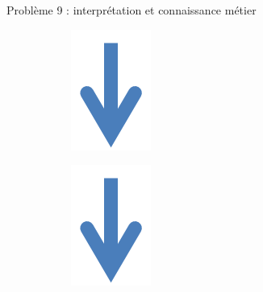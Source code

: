 \documentclass[10pt]{beamer}
\begin{document}
\begin{frame} {Problème 9 : interprétation et connaissance métier}
\begin{figure}[H]
\begin{subfigure}[l]{0.05\textwidth}
\centering
\includegraphics[width=\textwidth, height=\textwidth]{figures/fleche_bas.png}
\label{fige}
\end{subfigure}%
\hspace{0.37\textwidth}
\begin{subfigure}[l]{0.05\textwidth}
\centering
\includegraphics[width=\textwidth, height=\textwidth]{figures/fleche_bas.png}
\label{fige}
\end{subfigure}%


\end{figure}
\end{frame}
\end{document}
